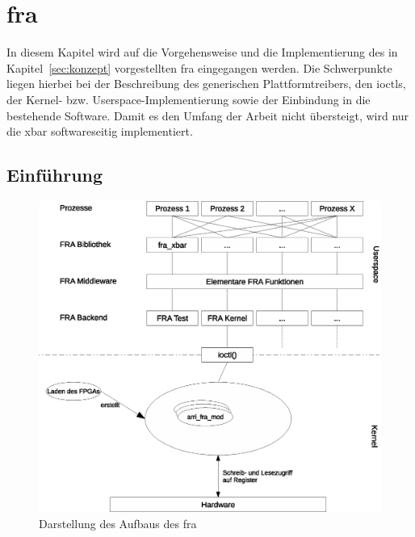 \chapter{\acl{fra}} \label{sec:haupt}
In diesem Kapitel wird auf die  Vorgehensweise und die Implementierung des in Kapitel~\ref{sec:konzept} vorgestellten \ac{fra} eingegangen werden. Die Schwerpunkte liegen hierbei bei der Beschreibung des generischen Plattformtreibers, den \ac{ioctl}s, der Kernel- bzw. Userspace-Implementierung sowie der Einbindung in die bestehende Software. Damit es den Umfang der Arbeit nicht übersteigt, wird nur die \ac{xbar} softwareseitig implementiert.

\section{Einführung}

\begin{figure}[!hbtp]
	\centering
	\includegraphics[width = 0.9\linewidth]{pictures/2020-01-16_FRA_Overview.eps}
	\smallskip
	\caption{Darstellung des Aufbaus des \ac{fra}}
	\label{fig:overview}
\end{figure} 

